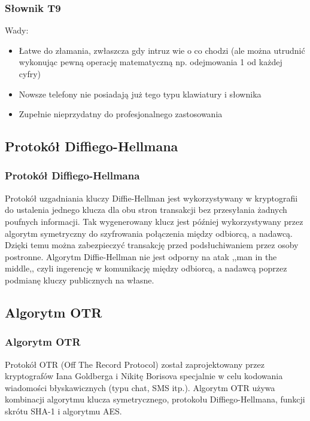 \documentclass[xcolor=table]{beamer}
\begin{document}
\begin{frame}
  \frametitle{Słownik T9}
Wady:
\begin{itemize}
\item Łatwe do złamania, zwłaszcza gdy intruz wie o co chodzi (ale można utrudnić wykonując pewną  operację matematyczną np. odejmowania 1 od każdej cyfry)
\item Nowsze telefony nie posiadają już tego typu klawiatury i słownika
\item Zupełnie nieprzydatny do profesjonalnego zastosowania
\end{itemize}

\end{frame}


\subsection{Protokół Diffiego-Hellmana}

\begin{frame}
  \frametitle{Protokół Diffiego-Hellmana}
	
Protokół uzgadniania kluczy Diffie-Hellman jest wykorzystywany w kryptografii
do ustalenia jednego klucza dla obu stron transakcji bez przesyłania żadnych 
poufnych informacji. Tak wygenerowany klucz jest później wykorzystywany przez
 algorytm symetryczny do szyfrowania połączenia między odbiorcą, a nadawcą. 
 Dzięki temu można zabezpieczyć transakcję przed podsłuchiwaniem przez osoby 
 postronne. Algorytm Diffie-Hellman nie jest odporny na atak 
 ,,man in the middle,, czyli ingerencję w komunikację między odbiorcą, 
 a nadawcą poprzez podmianę kluczy publicznych na własne.

\end{frame}


\subsection{Algorytm OTR}

\begin{frame}
  \frametitle{Algorytm OTR}
	
Protokół OTR (Off The Record Protocol) został zaprojektowany przez kryptografów Iana Goldberga i Nikitę Borisova
specjalnie w celu kodowania wiadomości błyskawicznych (typu chat, SMS itp.).
Algorytm OTR używa kombinacji algorytmu klucza symetrycznego, 
protokołu Diffiego-Hellmana, funkcji skrótu SHA-1 i algorytmu AES. 

\end{frame}
\end{document}
